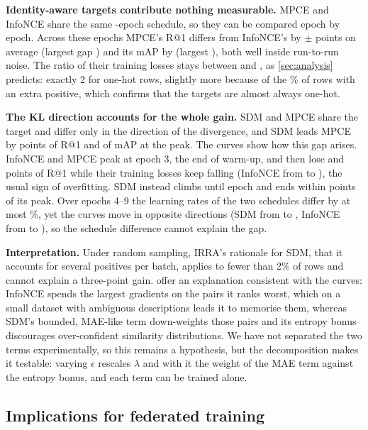 \textbf{Identity-aware targets contribute nothing measurable.} MPCE and InfoNCE share the same \nPairedEp-epoch schedule, so they can be compared epoch by epoch. Across these epochs MPCE's R@1 differs from InfoNCE's by \mpNceDiffR{}$\pm$\mpNceDiffRsd{} points on average (largest gap \mpNceDiffRmax) and its mAP by \mpNceDiffM{} (largest \mpNceDiffMmax), both well inside run-to-run noise. The ratio of their training losses stays between \lossRatioLo{} and \lossRatioHi, as \cref{sec:analysis} predicts: exactly 2 for one-hot rows, slightly more because of the \posFrac\% of rows with an extra positive, which confirms that the targets are almost always one-hot.

\textbf{The KL direction accounts for the whole gain.} SDM and MPCE share the target and differ only in the direction of the divergence, and SDM leads MPCE by \gapSdmMpceR{} points of R@1 and \gapSdmMpceM{} of mAP at the peak. The curves show how this gap arises. InfoNCE and MPCE peak at epoch 3, the end of warm-up, and then lose \nceDrop{} and \mpceDrop{} points of R@1 while their training losses keep falling (InfoNCE from \nceLossFirst{} to \nceLossLast), the usual sign of overfitting. SDM instead climbs until epoch \sdmPeakEp{} and ends within \sdmDrop{} points of its peak. Over epochs 4--9 the learning rates of the two schedules differ by at most \lrMaxRelDiff\%, yet the curves move in opposite directions (SDM from \sdmEpFourR{} to \sdmEpNineR, InfoNCE from \nceEpFourR{} to \nceEpNineR), so the schedule difference cannot explain the gap.

\textbf{Interpretation.} Under random sampling, IRRA's rationale for SDM, that it accounts for several positives per batch, applies to fewer than 2\% of rows and cannot explain a three-point gain.  offer an explanation consistent with the curves: InfoNCE spends the largest gradients on the pairs it ranks worst, which on a small dataset with ambiguous descriptions leads it to memorise them, whereas SDM's bounded, MAE-like term down-weights those pairs and its entropy bonus discourages over-confident similarity distributions. We have not separated the two terms experimentally, so this remains a hypothesis, but the decomposition makes it testable: varying $\epsilon$ rescales $\lambda$ and with it the weight of the MAE term against the entropy bonus, and each term can be trained alone.

\subsection{Implications for federated training}\label{sec:fl}

